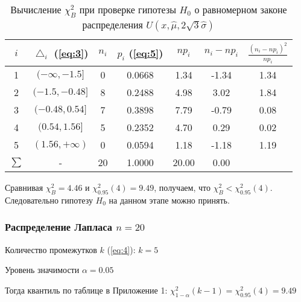 \documentclass[a4paper, 12pt]{article}
\begin{document}
\begin{table} [H]
\begin{center}
\begin{tabular}{|c|c|c|c|c|c|c|}
\hline 
$i$ & $\bigtriangleup_i$ (\ref{eq:3}) & $n_i$ & $p_i$ (\ref{eq:5}) & $np_i$ & $n_i - np_i$ & $\frac{(n_i-np_i)^2}{np_i}$ \\ 
\hline 
1 & $(-\infty, -1.5]$ & 0 & 0.0668 & 1.34 & -1.34 & 1.34 \\ 
\hline 
2 & $(-1.5, -0.48]$ & 8 & 0.2488 & 4.98 & 3.02 & 1.84 \\ 
\hline 
3 & $(-0.48, 0.54]$ & 7 & 0.3898 & 7.79 & -0.79 & 0.08 \\ 
\hline 
4 & $(0.54, 1.56]$ & 5 & 0.2352 & 4.70 & 0.29 & 0.02 \\ 
\hline 
5 & $(1.56, +\infty)$ & 0 & 0.0594 & 1.18 & -1.18 & 1.19 \\ 
\hline 
$\sum$ & - & 20 & 1.0000 & 20.00 & 0.00 & \color{red}{$4.46= \chi^2_B$} \\ 
\hline 
\end{tabular}
\caption{Вычисление $\chi^2_B$ при проверке гипотезы $H_0$ о равномерном законе распределения $U \left(x,\widehat{\mu}, 2\sqrt{3}\widehat{\sigma}\right)$} 
\end{center}
\end{table}
Сравнивая $\chi^2_B = 4.46$ и $\chi^2_0.95(4) = 9.49$, получаем, что $\chi^2_B < \chi^2_0.95(4)$. Следовательно гипотезу $H_0$ на данном этапе можно принять.

\subsubsection{Распределение Лапласа $n=20$}

Количество промежутков $k$ (\ref{eq:4}): $k = 5$

Уровень значимости $\alpha = 0.05$

Тогда квантиль по таблице в Приложение 1: $\chi^2_{1-\alpha}(k-1) = \chi^2_0.95(4) = 9.49$
\end{document}
